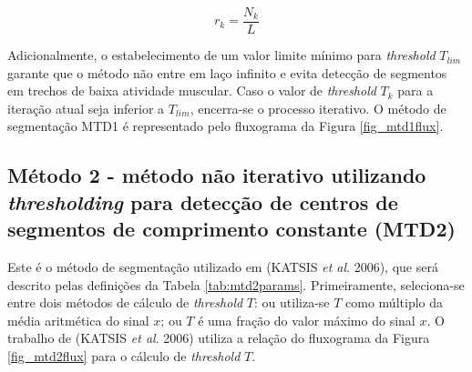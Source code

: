 \begin{equation}
\label{eq:mtd1rk}
  r_k = \frac{N_{k}}{L} 
\end{equation}

Adicionalmente, o estabelecimento de um valor limite mínimo para \emph{threshold} $T_{lim}$ garante que o método não entre em laço infinito e evita detecção de segmentos em trechos de baixa atividade muscular. Caso o valor de \emph{threshold} $T_k$ para a iteração atual seja inferior a $T_{lim}$, encerra-se o processo iterativo. O método de segmentação MTD1 é representado pelo fluxograma da Figura \ref{fig_mtd1flux}.



\subsection{Método 2 - método não iterativo utilizando \emph{thresholding} para detecção de centros de segmentos de comprimento constante (MTD2)}

Este é o método de segmentação utilizado em (KATSIS \emph{et al}. 2006), que será descrito pelas definições da Tabela \ref{tab:mtd2params}. Primeiramente, seleciona-se entre dois métodos de cálculo de \emph{threshold} $T$: ou utiliza-se $T$ como múltiplo da média aritmética do sinal $x$; ou $T$ é uma fração do valor máximo do sinal $x$. O trabalho de (KATSIS \emph{et al}. 2006) utiliza a relação do fluxograma da Figura \ref{fig_mtd2flux} para o cálculo de \emph{threshold} $T$.

\begin{table}[htb]
\end{table}

